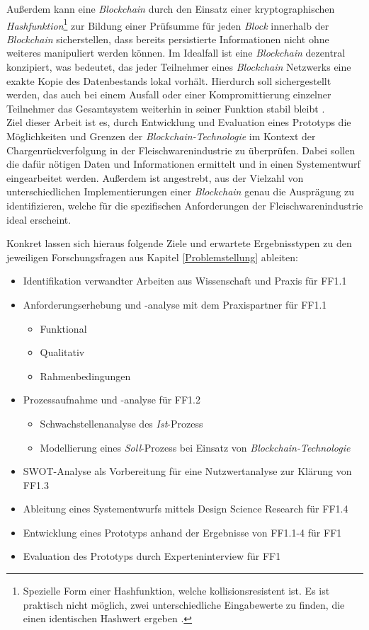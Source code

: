 Außerdem kann eine \textit{Blockchain} durch den Einsatz einer kryptographischen \textit{Hashfunktion}\footnote{Spezielle Form einer Hashfunktion, welche kollisionsresistent ist. Es ist praktisch nicht möglich, zwei unterschiedliche Eingabewerte zu finden, die einen identischen Hashwert ergeben \citep{Menezes1997}.} zur Bildung einer Prüfsumme für jeden \textit{Block} innerhalb der \textit{Blockchain} sicherstellen, dass bereits persistierte Informationen nicht ohne weiteres manipuliert werden können. Im Idealfall ist eine \textit{Blockchain} dezentral konzipiert, was bedeutet, das jeder Teilnehmer eines \textit{Blockchain} Netzwerks eine exakte Kopie des Datenbestands lokal vorhält. Hierdurch soll sichergestellt werden, das auch bei einem Ausfall oder einer Kompromittierung einzelner Teilnehmer das Gesamtsystem weiterhin in seiner Funktion stabil bleibt \citep{Drescher2017, Tribis2018}.\\

Ziel dieser Arbeit ist es, durch Entwicklung und Evaluation eines Prototyps die Möglichkeiten und Grenzen der \textit{Blockchain-Technologie} im Kontext der Chargenrückverfolgung in der Fleischwarenindustrie zu überprüfen. Dabei sollen die dafür nötigen Daten und Informationen ermittelt und in einen Systementwurf eingearbeitet werden. Außerdem ist angestrebt, aus der Vielzahl von unterschiedlichen Implementierungen einer \textit{Blockchain} genau die Ausprägung zu identifizieren, welche für die spezifischen Anforderungen der Fleischwarenindustrie ideal erscheint.

Konkret lassen sich hieraus folgende Ziele und erwartete Ergebnisstypen zu den jeweiligen Forschungsfragen aus Kapitel \ref{Problemstellung} ableiten:

\begin{itemize}
  \item Identifikation verwandter Arbeiten aus Wissenschaft und Praxis für FF1.1
  \item Anforderungserhebung und -analyse mit dem Praxispartner für FF1.1
  \begin{itemize}
    \item Funktional
    \item Qualitativ
    \item Rahmenbedingungen
  \end{itemize}
  \item Prozessaufnahme und -analyse für FF1.2
  \begin{itemize}
    \item Schwachstellenanalyse des \textit{Ist}-Prozess
    \item Modellierung eines \textit{Soll}-Prozess bei Einsatz von \textit{Blockchain-Technologie}
  \end{itemize}
  \item SWOT-Analyse als Vorbereitung für eine Nutzwertanalyse zur Klärung von FF1.3
  \item Ableitung eines Systementwurfs mittels Design Science Research für FF1.4
  \item Entwicklung eines Prototyps anhand der Ergebnisse von FF1.1-4 für FF1
  \item Evaluation des Prototyps durch Experteninterview für FF1
\end{itemize}

